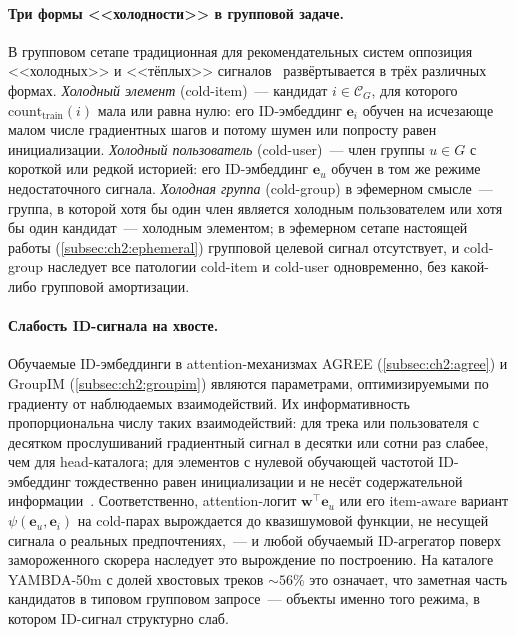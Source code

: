 \paragraph{Три формы <<холодности>> в групповой задаче.} В групповом сетапе традиционная для рекомендательных систем оппозиция <<холодных>> и <<тёплых>> сигналов~\cite{schedl2018current} развёртывается в трёх различных формах. \emph{Холодный элемент} (cold-item)~--- кандидат $i \in \mathcal{C}_G$, для которого $\mathrm{count}_{\mathrm{train}}(i)$ мала или равна нулю: его ID-эмбеддинг $\mathbf{e}_i$ обучен на исчезающе малом числе градиентных шагов и потому шумен или попросту равен инициализации. \emph{Холодный пользователь} (cold-user)~--- член группы $u \in G$ с короткой или редкой историей: его ID-эмбеддинг $\mathbf{e}_u$ обучен в том же режиме недостаточного сигнала. \emph{Холодная группа} (cold-group) в эфемерном смысле~--- группа, в которой хотя бы один член является холодным пользователем или хотя бы один кандидат~--- холодным элементом; в эфемерном сетапе настоящей работы (\ref{subsec:ch2:ephemeral}) групповой целевой сигнал отсутствует, и cold-group наследует все патологии cold-item и cold-user одновременно, без какой-либо групповой амортизации.

\paragraph{Слабость ID-сигнала на хвосте.} Обучаемые ID-эмбеддинги в attention-механизмах AGREE (\ref{subsec:ch2:agree}) и GroupIM (\ref{subsec:ch2:groupim}) являются параметрами, оптимизируемыми по градиенту от наблюдаемых взаимодействий. Их информативность пропорциональна числу таких взаимодействий: для трека или пользователя с десятком прослушиваний градиентный сигнал в десятки или сотни раз слабее, чем для head-каталога; для элементов с нулевой обучающей частотой ID-эмбеддинг тождественно равен инициализации и не несёт содержательной информации~\cite{park2008longtail, schedl2018current, bei2025coldstart_survey}. Соответственно, attention-логит $\mathbf{w}^\top \mathbf{e}_u$ или его item-aware вариант $\psi(\mathbf{e}_u, \mathbf{e}_i)$ на cold-парах вырождается до квазишумовой функции, не несущей сигнала о реальных предпочтениях,~--- и любой обучаемый ID-агрегатор поверх замороженного скорера наследует это вырождение по построению. На каталоге YAMBDA-50m с долей хвостовых треков $\sim\!56\%$ это означает, что заметная часть кандидатов в типовом групповом запросе~--- объекты именно того режима, в котором ID-сигнал структурно слаб.

